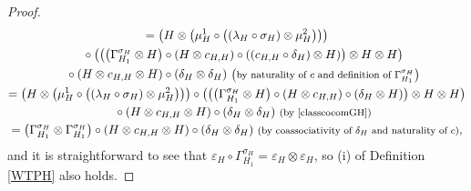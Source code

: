 \documentclass[10pt,a4paper]{amsart}
\numberwithin{equation}{section}
\begin{document}
\begin{proof}
\begin{gather*}
 =\bigl(H\otimes\bigl(\mu_{H}^{1}\circ\bigl((\lambda_{H}\circ\sigma_{H})\otimes\mu_{H}^{2}\bigr)\bigr)\bigr)\\
 \quad{}\circ\bigl(\bigl(\bigl(\Gamma_{H_{1}}^{\sigma_{H}}\otimes H\bigr)\circ(H\otimes c_{H,H})\circ((c_{H,H}\circ\delta_{H})\otimes H)\bigr)\otimes H\otimes H\bigr)\\
 \quad{}\circ(H\otimes c_{H,H}\otimes H)\circ(\delta_{H}\otimes\delta_{H}) \ \text{\footnotesize\textnormal{\big(by naturality of $c$ and definition of $\Gamma_{H_{1}}^{\sigma_{H}}$\big)}} \\
 =\bigl(H\otimes\bigl(\mu_{H}^{1}\circ\bigl((\lambda_{H}\circ\sigma_{H})\otimes\mu_{H}^{2}\bigr)\bigr)\bigr)\circ\bigl(\bigl(\bigl(\Gamma_{H_{1}}^{\sigma_{H}}\otimes H\bigr)\circ(H\otimes c_{H,H})\circ(\delta_{H}\otimes H)\bigr)\otimes H\otimes H\bigr)\\
 \quad{}\circ(H\otimes c_{H,H}\otimes H)\circ(\delta_{H}\otimes\delta_{H}) \ \text{\footnotesize\textnormal{(by \eqref{classcocomGH})}}\\
 =\bigl(\Gamma_{H_{1}}^{\sigma_{H}}\otimes\Gamma_{H_{1}}^{\sigma_{H}}\bigr)\circ(H\otimes c_{H,H}\otimes H)\circ(\delta_{H}\otimes\delta_{H})\ \text{\footnotesize\textnormal{(by coassociativity of $\delta_{H}$ and naturality of $c$)}},
\end{gather*}
and it is straightforward to see that $\varepsilon_{H}\circ\Gamma_{H_{1}}^{\sigma_{H}}=\varepsilon_{H}\otimes\varepsilon_{H}$, so (i) of Definition \ref{WTPH} also holds.
\end{proof}
\end{document}
